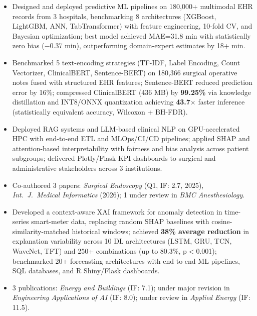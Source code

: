 \documentclass[10pt,a4paper,ragged2e]{altacv}
\begin{document}
\begin{itemize}
\item Designed and deployed predictive ML pipelines on 180,000+ multimodal EHR records from 3 hospitals, benchmarking 8 architectures (XGBoost, LightGBM, ANN, TabTransformer) with feature engineering, 10-fold CV, and Bayesian optimization; best model achieved MAE=31.8 min with statistically zero bias ($-$0.37 min), outperforming domain-expert estimates by 18+ min.
\item Benchmarked 5 text-encoding strategies (TF-IDF, Label Encoding, Count Vectorizer, ClinicalBERT, Sentence-BERT) on 180,366 surgical operative notes fused with structured EHR features; Sentence-BERT reduced prediction error by 16\%; compressed ClinicalBERT (436 MB) by \textbf{99.25\%} via knowledge distillation and INT8/ONNX quantization achieving \textbf{43.7$\times$} faster inference (statistically equivalent accuracy, Wilcoxon + BH-FDR).
\item Deployed RAG systems and LLM-based clinical NLP on GPU-accelerated HPC with end-to-end ETL and MLOps/CI/CD pipelines; applied SHAP and attention-based interpretability with fairness and bias analysis across patient subgroups; delivered Plotly/Flask KPI dashboards to surgical and administrative stakeholders across 3 institutions.
\item Co-authored 3 papers: \textit{Surgical Endoscopy} (Q1, IF: 2.7, 2025), \textit{Int.\ J.\ Medical Informatics} (2026); 1 under review in \textit{BMC Anesthesiology}.
\end{itemize}

\vspace{-5pt}
\divider

\begin{itemize}
\item Developed a context-aware XAI framework for anomaly detection in time-series smart-meter data, replacing random SHAP baselines with cosine-similarity-matched historical windows; achieved \textbf{38\% average reduction} in explanation variability across 10 DL architectures (LSTM, GRU, TCN, WaveNet, TFT) and 250+ combinations (up to 80.3\%, p$<$0.001); benchmarked 20+ forecasting architectures with end-to-end ML pipelines, SQL databases, and R Shiny/Flask dashboards.
\item 3 publications: \textit{Energy and Buildings} (IF: 7.1); under major revision in \textit{Engineering Applications of AI} (IF: 8.0); under review in \textit{Applied Energy} (IF: 11.5).
\end{itemize}
\end{document}
